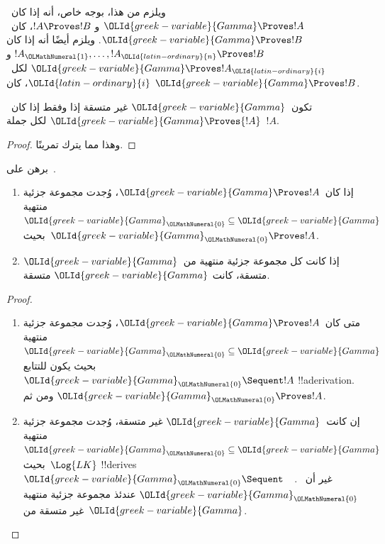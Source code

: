 \documentclass[../../../include/open-logic-section]{subfiles}
\begin{document}
ويلزم من هذا، بوجه خاص، أنه إذا كان~$\OLId{greek-variable}{Gamma} \Proves !A$ و
$!A \Proves !B$، كان~$\OLId{greek-variable}{Gamma} \Proves !B$. ويلزم أيضًا أنه إذا كان
$!A_\OLMathNumeral{1}, \dots, !A_\OLId{latin-ordinary}{n} \Proves !B$ و$\OLId{greek-variable}{Gamma} \Proves !A_\OLId{latin-ordinary}{i}$ لكل~$\OLId{latin-ordinary}{i}$، كان
$\OLId{greek-variable}{Gamma} \Proves !B$.

\begin{prop}
تكون~$\OLId{greek-variable}{Gamma}$ غير متسقة إذا وفقط إذا كان~$\OLId{greek-variable}{Gamma} \Proves {!A}$ لكل
جملة~$!A$.
\end{prop}

\begin{proof}
وهذا مما يترك تمرينًا.
\end{proof}

\begin{prob}
برهن على~.
\end{prob}

\begin{prop}[التراص]
  \begin{enumerate}
  \item إذا كان~$\OLId{greek-variable}{Gamma} \Proves !A$، وُجدت مجموعة جزئية منتهية
    $\OLId{greek-variable}{Gamma}_\OLMathNumeral{0} \subseteq \OLId{greek-variable}{Gamma}$ بحيث~$\OLId{greek-variable}{Gamma}_\OLMathNumeral{0} \Proves !A$.
  \item إذا كانت كل مجموعة جزئية منتهية من~$\OLId{greek-variable}{Gamma}$ متسقة، كانت
    $\OLId{greek-variable}{Gamma}$ متسقة.
  \end{enumerate}
\end{prop}

\begin{proof}
  \begin{enumerate}
    \item متى كان~$\OLId{greek-variable}{Gamma} \Proves !A$، وُجدت مجموعة جزئية منتهية
      $\OLId{greek-variable}{Gamma}_\OLMathNumeral{0} \subseteq \OLId{greek-variable}{Gamma}$ بحيث يكون للتتابع
      $\OLId{greek-variable}{Gamma}_\OLMathNumeral{0} \Sequent !A$ !!a{derivation}. ومن ثم
      $\OLId{greek-variable}{Gamma}_\OLMathNumeral{0} \Proves !A$.
    \item إن كانت~$\OLId{greek-variable}{Gamma}$ غير متسقة، وُجدت مجموعة جزئية منتهية
      $\OLId{greek-variable}{Gamma}_\OLMathNumeral{0} \subseteq \OLId{greek-variable}{Gamma}$ بحيث~$\Log{LK}$ !!{derive}s
      $\OLId{greek-variable}{Gamma}_\OLMathNumeral{0} \Sequent \quad$. غير أن~$\OLId{greek-variable}{Gamma}_\OLMathNumeral{0}$ عندئذ مجموعة جزئية
      منتهية غير متسقة من~$\OLId{greek-variable}{Gamma}$.
  \end{enumerate}
\end{proof}
\end{document}
